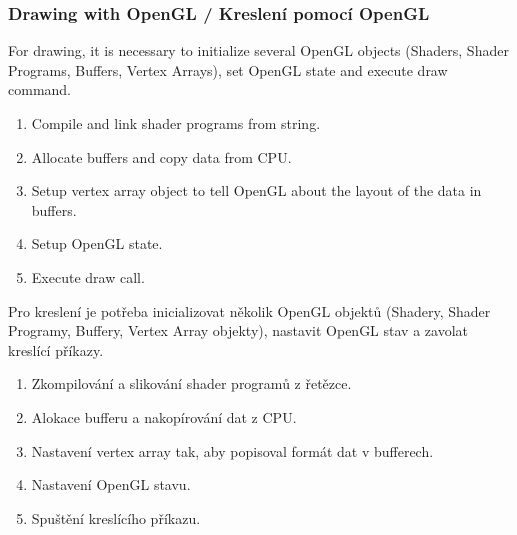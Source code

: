 \begin{frame}\frametitle{Drawing with OpenGL / Kreslení pomocí OpenGL}
\scriptsize
  For drawing, it is necessary to initialize several OpenGL objects (Shaders, Shader Programs, Buffers, Vertex Arrays), set OpenGL state and execute draw command.
  \begin{enumerate}
    \item Compile and link shader programs from string.
    \item Allocate buffers and copy data from CPU.
    \item Setup vertex array object to tell OpenGL about the layout of the data in buffers.
    \item Setup OpenGL state.
    \item Execute draw call.
  \end{enumerate}

  Pro kreslení je potřeba inicializovat několik OpenGL objektů (Shadery, Shader Programy, Buffery, Vertex Array objekty), nastavit OpenGL stav a zavolat kreslící příkazy.
  \begin{enumerate}
    \item Zkompilování a slikování shader programů z řetězce.
    \item Alokace bufferu a nakopírování dat z CPU.
    \item Nastavení vertex array tak, aby popisoval formát dat v bufferech.
    \item Nastavení OpenGL stavu.
    \item Spuštění kreslícího příkazu.
  \end{enumerate}
\end{frame}


